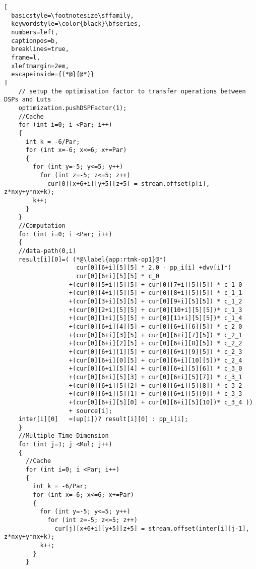 \begin{lstlisting}[
  basicstyle=\footnotesize\sffamily,
  keywordstyle=\color{black}\bfseries,
  numbers=left,
  captionpos=b,
  breaklines=true,
  frame=l,
  xleftmargin=2em,
  escapeinside={(*@}{@*)}
]
    // setup the optimisation factor to transfer operations between DSPs and Luts
    optimization.pushDSPFactor(1);
    //Cache
    for (int i=0; i <Par; i++)
    {
      int k = -6/Par;
      for (int x=-6; x<=6; x+=Par)
      {
        for (int y=-5; y<=5; y++)
          for (int z=-5; z<=5; z++)
            cur[0][x+6+i][y+5][z+5] = stream.offset(p[i], z*nxy+y*nx+k);
        k++;
      }
    }
    //Computation
    for (int i=0; i <Par; i++)
    {
    //data-path(0,i)
    result[i][0]=( (*@\label{app:rtmk-op1}@*)
                    cur[0][6+i][5][5] * 2.0 - pp_i[i] +dvv[i]*(
                    cur[0][6+i][5][5] * c_0
                  +(cur[0][5+i][5][5] + cur[0][7+i][5][5]) * c_1_0
                  +(cur[0][4+i][5][5] + cur[0][8+i][5][5]) * c_1_1
                  +(cur[0][3+i][5][5] + cur[0][9+i][5][5]) * c_1_2
                  +(cur[0][2+i][5][5] + cur[0][10+i][5][5])* c_1_3
                  +(cur[0][1+i][5][5] + cur[0][11+i][5][5])* c_1_4
                  +(cur[0][6+i][4][5] + cur[0][6+i][6][5]) * c_2_0
                  +(cur[0][6+i][3][5] + cur[0][6+i][7][5]) * c_2_1
                  +(cur[0][6+i][2][5] + cur[0][6+i][8][5]) * c_2_2
                  +(cur[0][6+i][1][5] + cur[0][6+i][9][5]) * c_2_3
                  +(cur[0][6+i][0][5] + cur[0][6+i][10][5])* c_2_4
                  +(cur[0][6+i][5][4] + cur[0][6+i][5][6]) * c_3_0
                  +(cur[0][6+i][5][3] + cur[0][6+i][5][7]) * c_3_1
                  +(cur[0][6+i][5][2] + cur[0][6+i][5][8]) * c_3_2
                  +(cur[0][6+i][5][1] + cur[0][6+i][5][9]) * c_3_3
                  +(cur[0][6+i][5][0] + cur[0][6+i][5][10])* c_3_4 ))
                  + source[i];
    inter[i][0]   =(up[i])? result[i][0] : pp_i[i];
    }
    //Multiple Time-Dimension
    for (int j=1; j <Mul; j++)
    {
      //Cache
      for (int i=0; i <Par; i++)
      {
        int k = -6/Par;
        for (int x=-6; x<=6; x+=Par)
        {
          for (int y=-5; y<=5; y++)
            for (int z=-5; z<=5; z++)
              cur[j][x+6+i][y+5][z+5] = stream.offset(inter[i][j-1], z*nxy+y*nx+k);
          k++;
        }
      }


\end{lstlisting}
